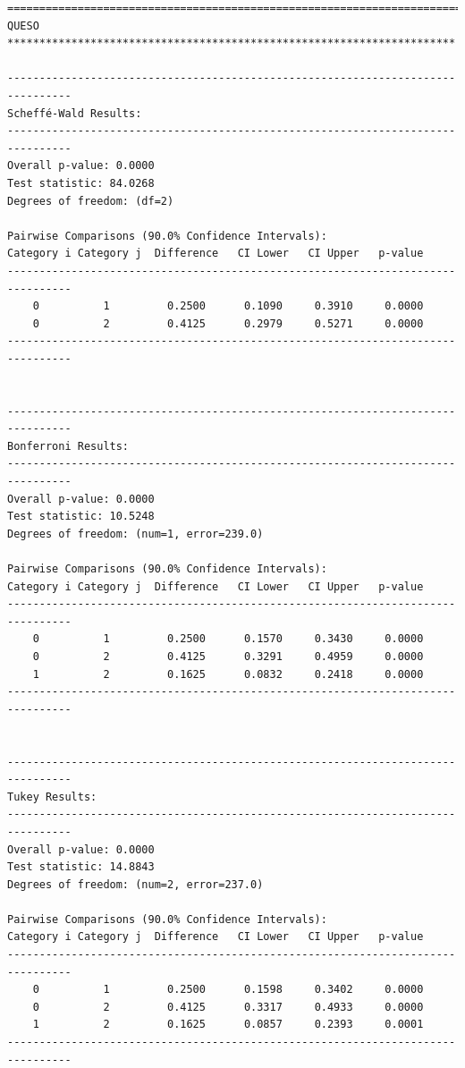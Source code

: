 \begin{lstlisting}
================================================================================
QUESO **********************************************************************

--------------------------------------------------------------------------------
Scheffé-Wald Results:
--------------------------------------------------------------------------------
Overall p-value: 0.0000
Test statistic: 84.0268
Degrees of freedom: (df=2)

Pairwise Comparisons (90.0% Confidence Intervals):
Category i Category j  Difference   CI Lower   CI Upper   p-value  
--------------------------------------------------------------------------------
    0          1         0.2500      0.1090     0.3910     0.0000  
    0          2         0.4125      0.2979     0.5271     0.0000  
--------------------------------------------------------------------------------


--------------------------------------------------------------------------------
Bonferroni Results:
--------------------------------------------------------------------------------
Overall p-value: 0.0000
Test statistic: 10.5248
Degrees of freedom: (num=1, error=239.0)

Pairwise Comparisons (90.0% Confidence Intervals):
Category i Category j  Difference   CI Lower   CI Upper   p-value  
--------------------------------------------------------------------------------
    0          1         0.2500      0.1570     0.3430     0.0000  
    0          2         0.4125      0.3291     0.4959     0.0000  
    1          2         0.1625      0.0832     0.2418     0.0000  
--------------------------------------------------------------------------------


--------------------------------------------------------------------------------
Tukey Results:
--------------------------------------------------------------------------------
Overall p-value: 0.0000
Test statistic: 14.8843
Degrees of freedom: (num=2, error=237.0)

Pairwise Comparisons (90.0% Confidence Intervals):
Category i Category j  Difference   CI Lower   CI Upper   p-value  
--------------------------------------------------------------------------------
    0          1         0.2500      0.1598     0.3402     0.0000  
    0          2         0.4125      0.3317     0.4933     0.0000  
    1          2         0.1625      0.0857     0.2393     0.0001  
--------------------------------------------------------------------------------


\end{lstlisting}
